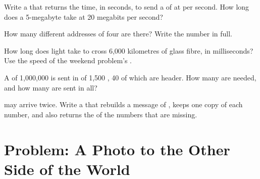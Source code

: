 \begin{exercise}[$\star\star$]\label{exo:g8:how-the-internet-works:8}
Write a   that returns the time,
in seconds, to send a  of   at   per
second. How long does a 5-megabyte  take at 20 megabits per second?
\end{exercise}

\begin{exercise}[$\star\star$]\label{exo:g8:how-the-internet-works:9}
How many different addresses of four  are there? Write the number in
full.
\end{exercise}

\begin{exercise}[$\star\star\star$]\label{exo:g8:how-the-internet-works:10}
How long does light take to cross 6,000 kilometres of glass fibre, in
milliseconds? Use the speed of the weekend problem's .
\end{exercise}

\begin{exercise}[$\star\star\star$]\label{exo:g8:how-the-internet-works:11}
A  of 1,000,000  is sent in  of 1,500 , 40 of which are
header. How many  are needed, and how many  are sent in all?
\end{exercise}

\begin{exercise}[$\star\star\star$]\label{exo:g8:how-the-internet-works:12}
 may arrive twice. Write a  
that rebuilds a message of  , keeps one copy of each
number, and also returns the  of the numbers that are missing.
\end{exercise}

\section{Problem: A Photo to the Other Side of the World}

